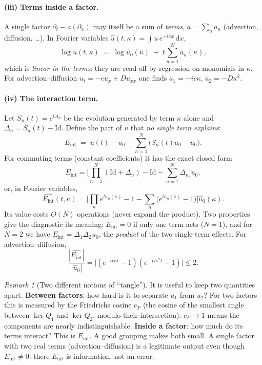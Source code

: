 \documentclass[11pt]{article}
\theoremstyle{plain}
\theoremstyle{definition}
\theoremstyle{remark}
\newtheorem{remark}[theorem]{Remark}
\newcommand{\dd}{\,\mathrm{d}}
\newcommand{\Eint}{E_{\mathrm{int}}}        %
\newenvironment{notebox}[1]{\begin{remark}[#1]}{\end{remark}}
\begin{document}
\paragraph{(iii) Terms inside a factor.}
A single factor $\partial_t-a(\partial_x)$ may itself be a sum of \emph{terms}, $a=\sum_n a_n$ (advection, diffusion, \dots). In Fourier variables $\hat u(t,\kappa)=\int u\,e^{-i\kappa x}\dd x$,
\[
\log\hat u(t,\kappa)\;=\;\log\hat u_0(\kappa)\;+\;t\sum_{n=1}^{N} a_n(\kappa),
\]
which is \emph{linear in the terms}: they are read off by regression on monomials in $\kappa$. For advection--diffusion $u_t=-cu_x+Du_{xx}$ one finds $a_1=-ic\kappa$, $a_2=-D\kappa^2$.

\paragraph{(iv) The interaction term.}
Let $S_n(t)=e^{tA_n}$ be the evolution generated by term $n$ alone and $\Delta_n=S_n(t)-\mathrm{Id}$. Define the part of $u$ that \emph{no single term explains}:
\[
\Eint\;=\;u(t)-u_0-\sum_{n=1}^N\big(S_n(t)u_0-u_0\big).
\]
For commuting terms (constant coefficients) it has the exact closed form
\[
\Eint=\Big[\prod_{n=1}^N(\mathrm{Id}+\Delta_n)-\mathrm{Id}-\sum_{n=1}^N\Delta_n\Big]u_0,
\]
or, in Fourier variables,
\[
\widehat{\Eint}(t,\kappa)=\Big[\prod_n e^{ta_n(\kappa)}-1-\sum_n\big(e^{ta_n(\kappa)}-1\big)\Big]\hat u_0(\kappa).
\]
Its value costs $O(N)$ operations (never expand the product). Two properties give the diagnostic its meaning: $\Eint=0$ if only one term acts ($N=1$), and for $N=2$ we have $\Eint=\Delta_1\Delta_2u_0$, the \emph{product} of the two single-term effects. For advection--diffusion,
\[
\frac{|\widehat{\Eint}|}{|\hat u_0|}=\big|(e^{-ic\kappa t}-1)(e^{-D\kappa^2 t}-1)\big|\le 2 .
\]

\begin{notebox}{Two different notions of ``tangle''}
It is useful to keep two quantities apart. \textbf{Between factors}: how hard is it to separate $u_1$ from $u_2$? For two factors this is measured by the Friedrichs cosine $c_F$ (the cosine of the smallest angle between $\ker Q_1$ and $\ker Q_2$, modulo their intersection): $c_F\to1$ means the components are nearly indistinguishable. \textbf{Inside a factor}: how much do its terms interact? This is $\Eint$. A good grouping makes both small. A single factor with two real terms (advection--diffusion) is a legitimate output even though $\Eint\neq0$: there $\Eint$ is information, not an error.
\end{notebox}
\end{document}
